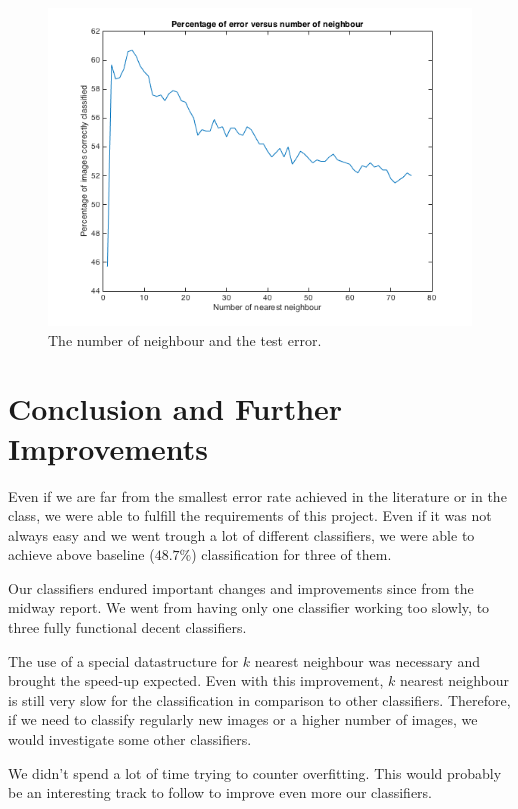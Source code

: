 \documentclass{article} %
\begin{document}
\begin{figure}
\centering
\includegraphics[scale=0.5]{kChoice.png}
\caption{The number of neighbour and the test error. }
\end{figure}






\section{Conclusion and Further Improvements}

Even if we are far from the smallest error rate achieved in the literature or in the class, we were able to fulfill the requirements of this project. Even if it was not always easy and  we went trough a lot of different classifiers, we were able to achieve above baseline ($48.7\%$) classification for three of them.

Our classifiers endured important changes and improvements since from the midway report. We went from having only one classifier working too slowly, to three fully functional decent classifiers.

The use of a special datastructure for $k$ nearest neighbour was necessary and brought the speed-up expected. Even with this improvement, $k$ nearest neighbour is still very slow for the classification in comparison to other classifiers. Therefore, if we need to classify regularly new images or a higher number of images, we would investigate some other classifiers.

We didn't spend a lot of time trying to counter overfitting. This would probably be an interesting track to follow to improve even more our classifiers. 
\end{document}

